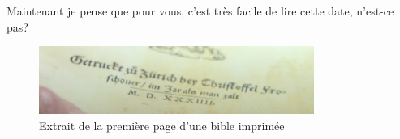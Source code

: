 Maintenant je pense que pour vous, c'est très facile de lire cette date, n'est-ce pas?
\begin{figure}[h]
    \centering
    \includegraphics[width=0.8\textwidth]{IMG/romans_in_bible.png}
    \caption{Extrait de la première page d'une bible imprimée}
    \label{fig:colorpicker}
\end{figure}
\medskip

